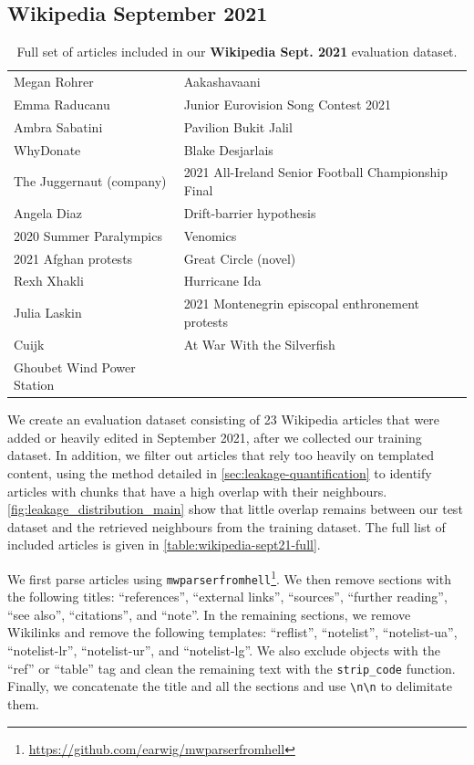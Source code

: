 \documentclass[11pt, a4paper, logo]{deepmind}
\begin{document}
\subsection{Wikipedia September 2021}
\label{appendix:wikipedia-sept21-desc}


\begin{table}[h]
\caption{Full set of articles included in our \textbf{Wikipedia Sept. 2021} evaluation dataset.}
\label{table:wikipedia-sept21-full}

\small

\begin{center}
\begin{tabular}{l l}
Megan Rohrer &
Aakashavaani \\
Emma Raducanu &
Junior Eurovision Song Contest 2021 \\
Ambra Sabatini &
Pavilion Bukit Jalil \\
WhyDonate &
Blake Desjarlais \\
The Juggernaut (company) &
2021 All-Ireland Senior Football Championship Final \\
Angela Diaz &
Drift-barrier hypothesis \\
2020 Summer Paralympics &
Venomics \\
2021 Afghan protests &
Great Circle (novel) \\
Rexh Xhakli &
Hurricane Ida \\
Julia Laskin &
2021 Montenegrin episcopal enthronement protests \\
Cuijk &
At War With the Silverfish \\
Ghoubet Wind Power Station \\
\bottomrule
\end{tabular}
\end{center}
\end{table}

We create an evaluation dataset consisting of 23 Wikipedia articles that were added or heavily edited in September 2021, after we collected our training dataset. In addition, we filter out articles that rely too heavily on templated content, using the method detailed in \autoref{sec:leakage-quantification} to identify articles with chunks that have a high overlap with their neighbours. \autoref{fig:leakage_distribution_main} show that little overlap remains between our test dataset and the retrieved neighbours from the training dataset.
The full list of included articles is given in \autoref{table:wikipedia-sept21-full}. 

We first parse articles using \texttt{mwparserfromhell}\footnote{\url{https://github.com/earwig/mwparserfromhell}}.
We then remove sections with the following titles: ``references'', ``external links'', ``sources'', ``further reading'', ``see also'', ``citations'', and ``note''.
In the remaining sections, we remove Wikilinks and remove the following templates: ``reflist'', ``notelist'', ``notelist-ua'', ``notelist-lr'', ``notelist-ur'', and ``notelist-lg''. We also exclude objects with the ``ref'' or ``table'' tag and clean the remaining text with the \texttt{strip\_code} function.
Finally, we concatenate the title and all the sections and use \texttt{\textbackslash{}n\textbackslash{}n} to delimitate them. 
\end{document}
